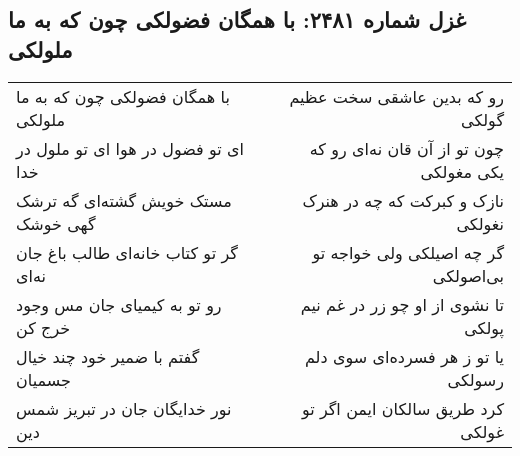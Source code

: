 \begin{center}
\section*{غزل شماره ۲۴۸۱: با همگان فضولکی چون که به ما ملولکی}
\label{sec:2481}
\begin{longtable}{l p{0.5cm} r}
با همگان فضولکی چون که به ما ملولکی
&&
رو که بدین عاشقی سخت عظیم گولکی
\\
ای تو فضول در هوا ای تو ملول در خدا
&&
چون تو از آن قان نه‌ای رو که یکی مغولکی
\\
مستک خویش گشته‌ای گه ترشک گهی خوشک
&&
نازک و کبرکت که چه در هنرک نغولکی
\\
گر تو کتاب خانه‌ای طالب باغ جان نه‌ای
&&
گر چه اصیلکی ولی خواجه تو بی‌اصولکی
\\
رو تو به کیمیای جان مس وجود خرج کن
&&
تا نشوی از او چو زر در غم نیم پولکی
\\
گفتم با ضمیر خود چند خیال جسمیان
&&
یا تو ز هر فسرده‌ای سوی دلم رسولکی
\\
نور خدایگان جان در تبریز شمس دین
&&
کرد طریق سالکان ایمن اگر تو غولکی
\\
\end{longtable}
\end{center}
